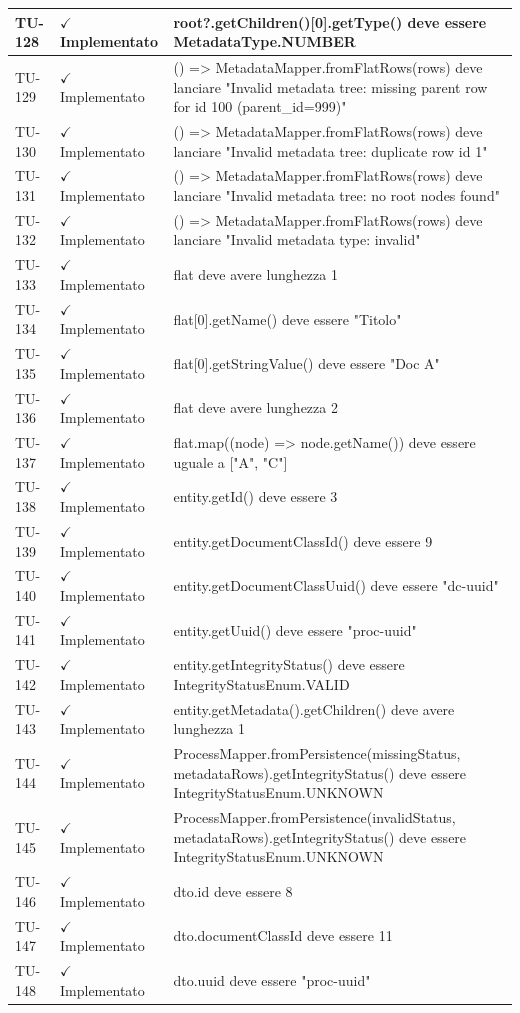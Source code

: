 ﻿\documentclass[a4paper,12pt]{article}
\newcommand{\ok}{\textcolor{green!60!black}{$\checkmark$ Implementato}}
\begin{document}
\begin{longtable}{|p{2cm}|p{3.5cm}|p{9.5cm}|}
TU-128 & \ok & root?.getChildren()[0].getType() deve essere MetadataType.NUMBER \\
\hline
TU-129 & \ok & () => MetadataMapper.fromFlatRows(rows) deve lanciare "Invalid metadata tree: missing parent row for id 100 (parent\_id=999)" \\
\hline
TU-130 & \ok & () => MetadataMapper.fromFlatRows(rows) deve lanciare "Invalid metadata tree: duplicate row id 1" \\
\hline
TU-131 & \ok & () => MetadataMapper.fromFlatRows(rows) deve lanciare "Invalid metadata tree: no root nodes found" \\
\hline
TU-132 & \ok & () => MetadataMapper.fromFlatRows(rows) deve lanciare "Invalid metadata type: invalid" \\
\hline
TU-133 & \ok & flat deve avere lunghezza 1 \\
\hline
TU-134 & \ok & flat[0].getName() deve essere "Titolo" \\
\hline
TU-135 & \ok & flat[0].getStringValue() deve essere "Doc A" \\
\hline
TU-136 & \ok & flat deve avere lunghezza 2 \\
\hline
TU-137 & \ok & flat.map((node) => node.getName()) deve essere uguale a ["A", "C"] \\
\hline
TU-138 & \ok & entity.getId() deve essere 3 \\
\hline
TU-139 & \ok & entity.getDocumentClassId() deve essere 9 \\
\hline
TU-140 & \ok & entity.getDocumentClassUuid() deve essere "dc-uuid" \\
\hline
TU-141 & \ok & entity.getUuid() deve essere "proc-uuid" \\
\hline
TU-142 & \ok & entity.getIntegrityStatus() deve essere IntegrityStatusEnum.VALID \\
\hline
TU-143 & \ok & entity.getMetadata().getChildren() deve avere lunghezza 1 \\
\hline
TU-144 & \ok & ProcessMapper.fromPersistence(missingStatus, metadataRows).getIntegrityStatus() deve essere IntegrityStatusEnum.UNKNOWN \\
\hline
TU-145 & \ok & ProcessMapper.fromPersistence(invalidStatus, metadataRows).getIntegrityStatus() deve essere IntegrityStatusEnum.UNKNOWN \\
\hline
TU-146 & \ok & dto.id deve essere 8 \\
\hline
TU-147 & \ok & dto.documentClassId deve essere 11 \\
\hline
TU-148 & \ok & dto.uuid deve essere "proc-uuid" \\

\end{longtable}
\end{document}
